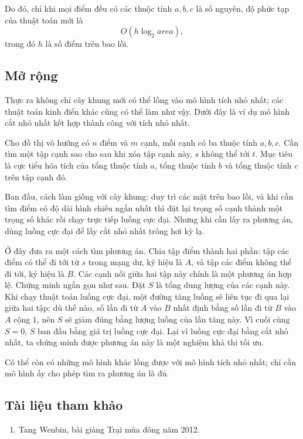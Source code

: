 \documentclass[11pt]{article}
\begin{document}
Do đó, chỉ khi mọi điểm đều có các thuộc tính \(a,b,c\) là số nguyên, độ phức
tạp của thuật toán mới là
\[
  O(h\log_2 \mathit{area}),
\]
trong đó \(h\) là số điểm trên bao lồi.

\subsection{Mở rộng}

Thực ra không chỉ cây khung mới có thể lồng vào mô hình tích nhỏ nhất; các thuật
toán kinh điển khác cũng có thể làm như vậy. Dưới đây là ví dụ mô hình cắt nhỏ
nhất kết hợp thành công với tích nhỏ nhất.

Cho đồ thị vô hướng có \(n\) điểm và \(m\) cạnh, mỗi cạnh có ba thuộc tính
\(a,b,c\). Cần tìm một tập cạnh sao cho sau khi xóa tập cạnh này, \(s\) không
thể tới \(t\). Mục tiêu là cực tiểu hóa tích của tổng thuộc tính \(a\), tổng
thuộc tính \(b\) và tổng thuộc tính \(c\) trên tập cạnh đó.

Ban đầu, cách làm giống với cây khung: duy trì các mặt trên bao lồi, và khi cần
tìm điểm có độ dài hình chiếu ngắn nhất thì đặt lại trọng số cạnh thành một
trọng số khác rồi chạy trực tiếp luồng cực đại. Nhưng khi cần lấy ra phương án,
dùng luồng cực đại để lấy cắt nhỏ nhất trông hơi kỳ lạ.

Ở đây đưa ra một cách tìm phương án. Chia tập điểm thành hai phần: tập các điểm
có thể đi tới từ \(s\) trong mạng dư, ký hiệu là \(A\), và tập các điểm không
thể đi tới, ký hiệu là \(B\). Các cạnh nối giữa hai tập này chính là một phương
án hợp lệ. Chứng minh ngắn gọn như sau. Đặt \(S\) là tổng dung lượng của các
cạnh này. Khi chạy thuật toán luồng cực đại, một đường tăng luồng sẽ liên tục
đi qua lại giữa hai tập; dù thế nào, số lần đi từ \(A\) vào \(B\) nhất định
bằng số lần đi từ \(B\) vào \(A\) cộng \(1\), nên \(S\) sẽ giảm đúng bằng lượng
luồng của lần tăng này. Vì cuối cùng \(S=0\), \(S\) ban đầu bằng giá trị luồng
cực đại. Lại vì luồng cực đại bằng cắt nhỏ nhất, ta chứng minh được phương án
này là một nghiệm khả thi tối ưu.

Có thể còn có những mô hình khác lồng được với mô hình tích nhỏ nhất; chỉ cần
mô hình ấy cho phép tìm ra phương án là đủ.

\subsection*{Tài liệu tham khảo}

\begin{enumerate}
  \item Tang Wenbin, bài giảng Trại mùa đông năm 2012.
\end{enumerate}
\end{document}
